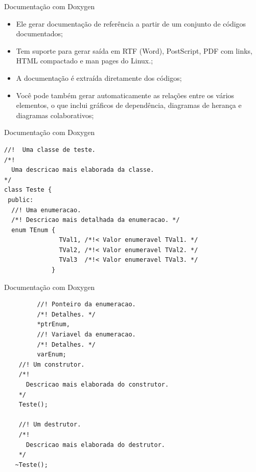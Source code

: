 \documentclass[12pt,table,xcolor={dvipsnames}]{beamer}
\begin{document}
\begin{frame}{Documentação com Doxygen}
\begin{itemize}
\item  Ele gerar  documentação de referência a partir de um conjunto de códigos documentados;
\item  Tem suporte para gerar saída em RTF (Word), PostScript, PDF com links, HTML compactado e man pages do Linux.;
\item A documentação é extraída diretamente dos códigos;
\item Você pode também gerar automaticamente as relações entre os vários elementos, o que inclui gráficos de dependência, diagramas de herança e diagramas colaborativos;
\end{itemize}
\end{frame}

\begin{frame}[fragile]{Documentação com Doxygen}
\begin{lstlisting}
//!  Uma classe de teste.
/*!
  Uma descricao mais elaborada da classe.
*/
class Teste {
 public:
  //! Uma enumeracao.
  /*! Descricao mais detalhada da enumeracao. */
  enum TEnum {
               TVal1, /*!< Valor enumeravel TVal1. */
               TVal2, /*!< Valor enumeravel TVal2. */
               TVal3  /*!< Valor enumeravel TVal3. */
             }

\end{lstlisting}
\end{frame}

\begin{frame}[fragile]{Documentação com Doxygen}
\begin{lstlisting}
         //! Ponteiro da enumeracao.
         /*! Detalhes. */
         *ptrEnum,
         //! Variavel da enumeracao.
         /*! Detalhes. */
         varEnum;
    //! Um construtor.
    /*!
      Descricao mais elaborada do construtor.
    */
    Teste();

    //! Um destrutor.
    /*!
      Descricao mais elaborada do destrutor.
    */
   ~Teste();
\end{lstlisting}
\end{frame}
\end{document}
